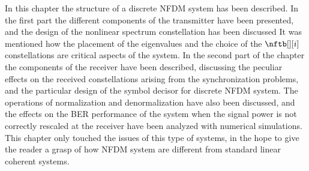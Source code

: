 In this chapter the structure of a discrete \ac{NFDM} system has been described.
In the first part the different components of the transmitter have been presented, and the design of the nonlinear spectrum constellation has been discussed It was mentioned how the placement of the eigenvalues and the choice of the $\nftb[][i]$ constellations are critical aspects of the system.
In the second part of the chapter the components of the receiver have been described, discussing the peculiar effects on the received constellations arising from the synchronization problems, and the particular design of the symbol decisor for discrete \ac{NFDM} system.
The operations of normalization and denormalization have also been discussed, and the effects on the \ac{BER} performance of the system when the signal power is not correctly rescaled at the receiver have been analyzed with numerical simulations.
This chapter only touched the issues of this type of systems, in the hope to give the reader a grasp of how \ac{NFDM} system are different from standard linear coherent systems.


